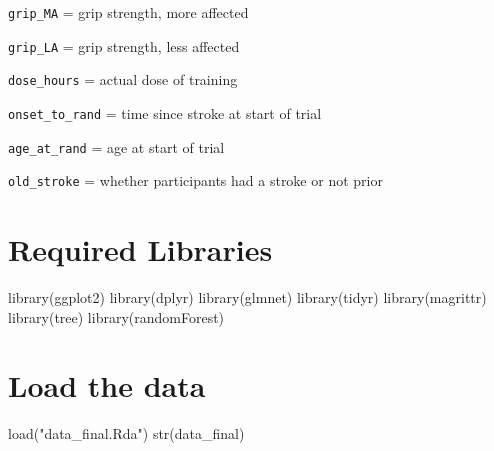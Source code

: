 \documentclass[
]{article}
\newenvironment{Shaded}{\begin{snugshade}}{\end{snugshade}}
\newcommand{\FunctionTok}[1]{\textcolor[rgb]{0.00,0.00,0.00}{#1}}
\newcommand{\NormalTok}[1]{#1}
\newcommand{\StringTok}[1]{\textcolor[rgb]{0.31,0.60,0.02}{#1}}
\begin{document}
\texttt{grip\_MA} = grip strength, more affected

\texttt{grip\_LA} = grip strength, less affected

\texttt{dose\_hours} = actual dose of training

\texttt{onset\_to\_rand} = time since stroke at start of trial

\texttt{age\_at\_rand} = age at start of trial

\texttt{old\_stroke} = whether participants had a stroke or not prior

\hypertarget{required-libraries}{%
\section{Required Libraries}\label{required-libraries}}

\begin{Shaded}
\begin{Highlighting}[]
\FunctionTok{library}\NormalTok{(ggplot2)}
\FunctionTok{library}\NormalTok{(dplyr)}
\FunctionTok{library}\NormalTok{(glmnet)}
\FunctionTok{library}\NormalTok{(tidyr)}
\FunctionTok{library}\NormalTok{(magrittr)}
\FunctionTok{library}\NormalTok{(tree)}
\FunctionTok{library}\NormalTok{(randomForest)}
\end{Highlighting}
\end{Shaded}

\hypertarget{load-the-data}{%
\section{Load the data}\label{load-the-data}}

\begin{Shaded}
\begin{Highlighting}[]
\FunctionTok{load}\NormalTok{(}\StringTok{"data\_final.Rda"}\NormalTok{)}
\FunctionTok{str}\NormalTok{(data\_final)}
\end{Highlighting}
\end{Shaded}
\end{document}
